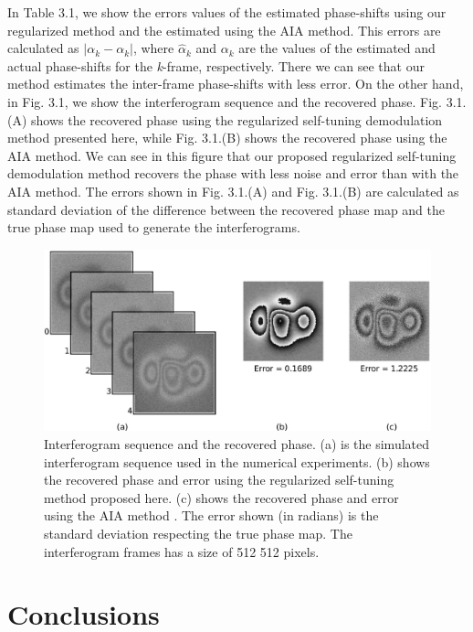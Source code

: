 In Table 3.1, we show the errors values of the estimated phase-shifts using our
regularized method and the estimated using the AIA method. This errors
are calculated as $|\alpha_{k} - \alpha_{k}|$,
where $\hat{\alpha}_{k}$ and $\alpha_{k}$ are the values of the
estimated and actual phase-shifts for the \emph{k}-frame, respectively.
There we can see that our method estimates the inter-frame phase-shifts
with less error. On the other hand, in Fig. 3.1, we show the interferogram 
sequence and the recovered phase. Fig.
3.1.(A) shows the recovered phase using the regularized self-tuning
demodulation method presented here, while Fig. 3.1.(B) shows the recovered
phase using the AIA method. We can see in this figure that our proposed
regularized self-tuning demodulation method recovers the phase with
less noise and error than with the AIA method. The errors shown in
Fig. 3.1.(A) and Fig. 3.1.(B) are calculated as standard deviation of
the difference between the recovered phase map and the true phase
map used to generate the interferograms.

\begin{figure}
\begin{centering}
\includegraphics[scale=0.2]{Chpt2_figures/Steps.eps}
\par\end{centering}

\caption{Interferogram sequence and the recovered phase. (a) is the simulated 
interferogram sequence used in the numerical experiments. (b) shows the recovered
phase and error using the regularized self-tuning method proposed
here. (c) shows the recovered phase and error using the AIA method \cite{Wang:04}.
The error shown (in radians) is the standard deviation respecting
the true phase map. The interferogram frames has a size of 512 \texttimes{}
512 pixels.}
\end{figure}

\section{Conclusions}

